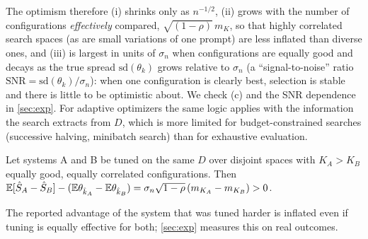 The optimism therefore (i) shrinks only as $n^{-1/2}$, (ii) grows with the number of configurations \emph{effectively} compared, $\sqrt{(1-\rho)}\,m_K$, so that highly correlated search spaces (as are small variations of one prompt) are less inflated than diverse ones, and (iii) is largest in units of $\sigma_n$ when configurations are equally good and decays as the true spread $\mathrm{sd}(\theta_k)$ grows relative to $\sigma_n$ (a ``signal-to-noise'' ratio $\mathrm{SNR}=\mathrm{sd}(\theta_k)/\sigma_n$): when one configuration is clearly best, selection is stable and there is little to be optimistic about. We check (c) and the SNR dependence in \cref{sec:exp}. For adaptive optimizers the same logic applies with the information the search extracts from $D$, which is more limited for budget-constrained searches (successive halving, minibatch search) than for exhaustive evaluation.

\begin{proposition}\label{prop:cmp}
Let systems A and B be tuned on the same $D$ over disjoint spaces with $K_A>K_B$ equally good, equally correlated configurations. Then $\mathbb{E}[\hat S_A-\hat S_B]-(\mathbb{E}\theta_{\hat k_A}-\mathbb{E}\theta_{\hat k_B})=\sigma_n\sqrt{1-\rho}\,(m_{K_A}-m_{K_B})>0$.
\end{proposition}
\noindent The reported advantage of the system that was tuned harder is inflated even if tuning is equally effective for both; \cref{sec:exp} measures this on real outcomes.
